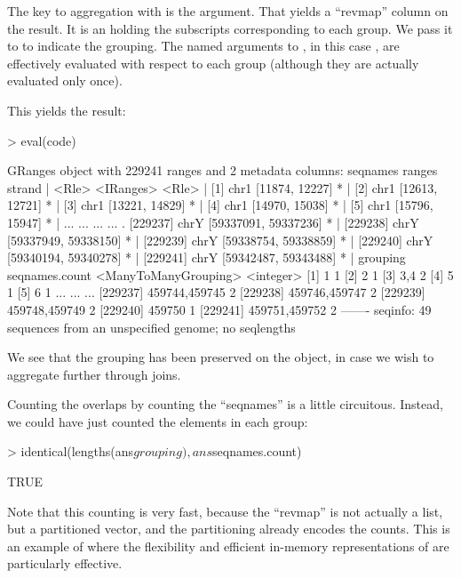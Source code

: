 \documentclass[10pt]{article}
\begin{document}
The key to aggregation with  is the
 argument. That yields a ``revmap'' column on
the result. It is an  holding the subscripts
corresponding to each group. We pass it to  to
indicate the grouping. The named arguments to ,
in this case , are effectively evaluated with
respect to each group (although they are actually evaluated only once).

This yields the result:
\begin{Schunk}
\begin{Sinput}
> eval(code)
\end{Sinput}
\begin{Soutput}
GRanges object with 229241 ranges and 2 metadata columns:
           seqnames               ranges strand |
              <Rle>            <IRanges>  <Rle> |
       [1]     chr1       [11874, 12227]      * |
       [2]     chr1       [12613, 12721]      * |
       [3]     chr1       [13221, 14829]      * |
       [4]     chr1       [14970, 15038]      * |
       [5]     chr1       [15796, 15947]      * |
       ...      ...                  ...    ... .
  [229237]     chrY [59337091, 59337236]      * |
  [229238]     chrY [59337949, 59338150]      * |
  [229239]     chrY [59338754, 59338859]      * |
  [229240]     chrY [59340194, 59340278]      * |
  [229241]     chrY [59342487, 59343488]      * |
                       grouping seqnames.count
           <ManyToManyGrouping>      <integer>
       [1]                    1              1
       [2]                    2              1
       [3]                  3,4              2
       [4]                    5              1
       [5]                    6              1
       ...                  ...            ...
  [229237]        459744,459745              2
  [229238]        459746,459747              2
  [229239]        459748,459749              2
  [229240]               459750              1
  [229241]        459751,459752              2
  -------
  seqinfo: 49 sequences from an unspecified genome; no seqlengths
\end{Soutput}
\end{Schunk}
We see that the grouping has been preserved on the object, in case we
wish to aggregate further through joins.

Counting the overlaps by counting the ``seqnames'' is a little
circuitous. Instead, we could have just counted the elements in each group:
\begin{Schunk}
\begin{Sinput}
> identical(lengths(ans$grouping), ans$seqnames.count)
\end{Sinput}
\begin{Soutput}
[1] TRUE
\end{Soutput}
\end{Schunk}
Note that this counting is very fast, because the ``revmap''
 is not actually a list, but a partitioned vector,
and the partitioning already encodes the counts. This is an example of
where the flexibility and efficient in-memory representations of
\Bioconductor{} are particularly effective.
\end{document}
